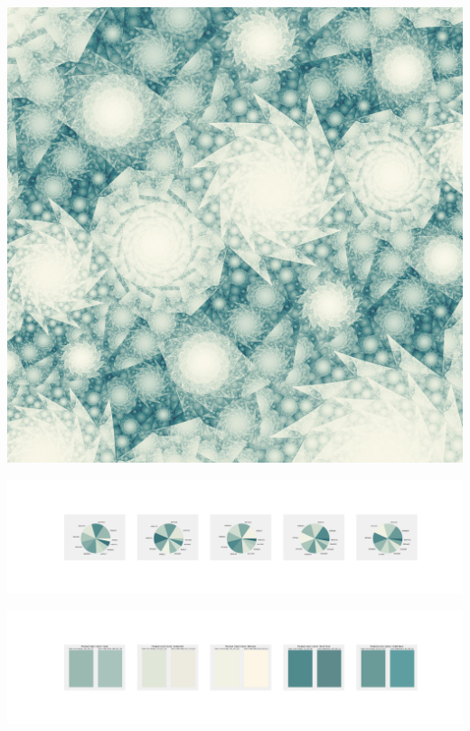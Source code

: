 \documentclass[11pt]{article}
\begin{document}
\begin{landscape}
    \begin{center}
    \includegraphics[width=\textwidth]{./nbimg/file (427).jpg}
    \end{center}

    \begin{center}
    \includegraphics[width=250mm]{./nbimg/pie-364.jpg}
    \end{center}

    \begin{center}
    \includegraphics[width=250mm]{./nbimg/peak-364.jpg}
    \end{center}
    


\end{landscape}
\end{document}
